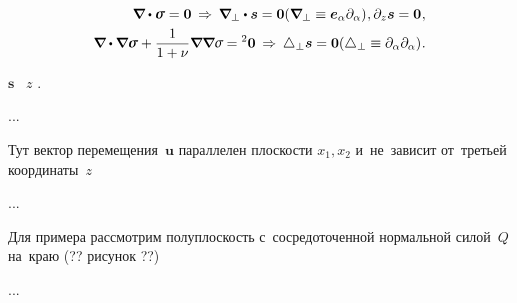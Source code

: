 \nopagebreak\vspace{-0.2em}\begin{align}
\boldnabla \dotp \linearstress = \bm{0}
\hspace{.2em} \Rightarrow \hspace{.2em}
\boldnabla_{\bot} \dotp \bm{s} = \bm{0}
(\boldnabla_{\bot} \equiv \bm{e}_{\alpha} \partial_{\alpha})
\hspace{.1ex} ,
\partial_{z} \bm{s} = \bm{0}
\hspace{.1ex} ,
\\
%
\boldnabla \dotp \boldnabla \linearstress + \displaystyle\frac{1}{1 + \nu} \boldnabla \boldnabla \mathsigma = {^2}\bm{0}
\hspace{.2em} \Rightarrow \hspace{.2em}
\Laplacian_{\bot} \bm{s} = \bm{0}
(\Laplacian_{\bot} \equiv \partial_{\alpha} \partial_{\alpha})
\hspace{.1ex} .
\end{align}

\noindent
{} $\bm{s}$ ~$z$    .

...




\label{para:planedeformation.linearclassicalelasticity}

\begin{otherlanguage}{russian}

Тут вектор перемещения~$\bm{u}$ параллелен плоскости ${x_1, x_2}$ и~не~зависит от~третьей координаты~$z$

...

Для примера рассмотрим полуплоскость с~сосредоточенной нормальной силой~$Q$ на~краю (?? рисунок ??)

...

\end{otherlanguage}

